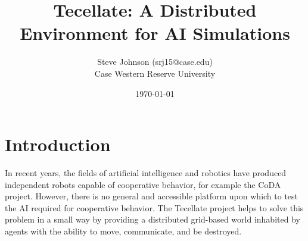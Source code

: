 \documentclass[12pt]{article}
\title{Tecellate: A Distributed Environment for AI Simulations}
\author{
        Steve Johnson (srj15@case.edu)\\
        Case Western Reserve University\\
}
\date{\today}
\begin{document}
\doublespacing
\maketitle


\section{Introduction}

In recent years, the fields of artificial intelligence and robotics have produced independent robots capable of cooperative behavior, for example the CoDA project\cite{CoDA}. However, there is no general and accessible platform upon which to test the AI required for cooperative behavior. The Tecellate project helps to solve this problem in a small way by providing a distributed grid-based world inhabited by agents with the ability to move, communicate, and be destroyed.













\end{document}
